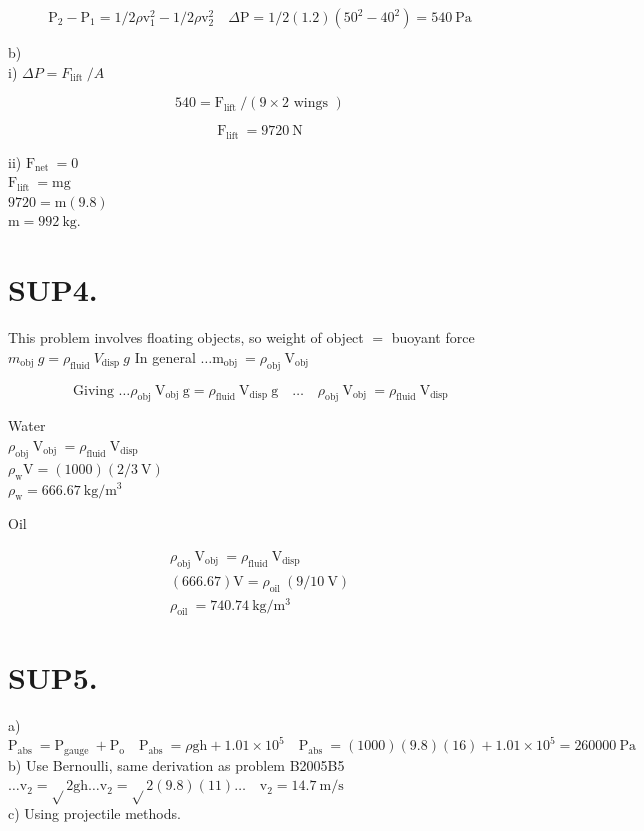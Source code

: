 \begin{enumerate}
$$
\mathrm{P}_{2}-\mathrm{P}_{1}=1 / 2 \rho \mathrm{v}_{1}^{2}-1 / 2 \rho \mathrm{v}_{2}^{2} \quad \Delta \mathrm{P}=1 / 2(1.2)\left(50^{2}-40^{2}\right)=540 \mathrm{~Pa}
$$

b)\\
i) $\Delta P=F_{\text {lift }} / A$

$$
540=\mathrm{F}_{\text {lift }} /(9 \times 2 \text { wings })
$$

$$
\mathrm{F}_{\text {lift }}=9720 \mathrm{~N}
$$

ii) $\mathrm{F}_{\text {net }}=0$\\
$\mathrm{F}_{\text {lift }}=\mathrm{mg}$\\
$9720=\mathrm{m}(9.8)$\\
$\mathrm{m}=992 \mathrm{~kg}$.

\section*{SUP4.}
This problem involves floating objects, so weight of object $=$ buoyant force $m_{\text {obj }} g=\rho_{\text {fluid }} V_{\text {disp }} g$ In general $\ldots \mathrm{m}_{\text {obj }}=\rho_{\text {obj }} \mathrm{V}_{\text {obj }}$

$$
\text { Giving } \ldots \rho_{\text {obj }} \mathrm{V}_{\text {obj }} \mathrm{g}=\rho_{\text {fluid }} \mathrm{V}_{\text {disp }} \mathrm{g} \quad \ldots \quad \rho_{\text {obj }} \mathrm{V}_{\text {obj }}=\rho_{\text {fluid }} \mathrm{V}_{\text {disp }}
$$

Water\\
$\rho_{\text {obj }} \mathrm{V}_{\text {obj }}=\rho_{\text {fluid }} \mathrm{V}_{\text {disp }}$\\
$\rho_{\mathrm{w}} \mathrm{V}=(1000)(2 / 3 \mathrm{~V})$\\
$\rho_{\mathrm{w}}=666.67 \mathrm{~kg} / \mathrm{m}^{3}$

Oil

$$
\begin{gathered}
\rho_{\text {obj }} \mathrm{V}_{\text {obj }}=\rho_{\text {fluid }} \mathrm{V}_{\text {disp }} \\
(666.67) \mathrm{V}=\rho_{\text {oil }}(9 / 10 \mathrm{~V}) \\
\rho_{\text {oil }}=740.74 \mathrm{~kg} / \mathrm{m}^{3}
\end{gathered}
$$

\section*{SUP5.}
a) $\mathrm{P}_{\text {abs }}=\mathrm{P}_{\text {gauge }}+\mathrm{P}_{\mathrm{o}} \quad \mathrm{P}_{\text {abs }}=\rho \mathrm{gh}+1.01 \times 10^{5} \quad \mathrm{P}_{\text {abs }}=(1000)(9.8)(16)+1.01 \times 10^{5}=260000 \mathrm{~Pa}$\\
b) Use Bernoulli, same derivation as problem B2005B5 $\ldots \mathrm{v}_{2}=\sqrt{ } 2 \mathrm{gh} \ldots \mathrm{v}_{2}=\sqrt{ } 2(9.8)(11) \ldots \quad \mathrm{v}_{2}=14.7 \mathrm{~m} / \mathrm{s}$\\
c) Using projectile methods.


\end{enumerate}
